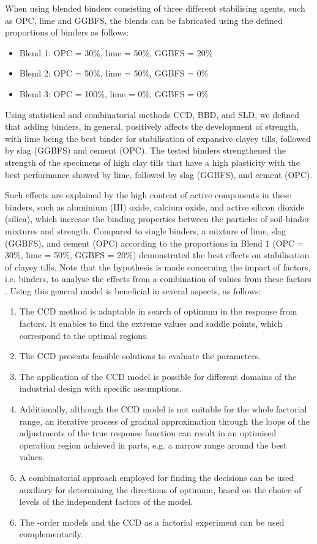 \documentclass[eprint,
]{actapoly}
\begin{document}
When using blended binders consisting of three different stabilising agents, such as OPC, lime and GGBFS, the blends can be fabricated using the defined proportions of binders as follows:

\begin{itemize}
	\item [--] Blend 1: OPC = 30\%, lime = 50\%, GGBFS = 20\%
	\item [--] Blend 2: OPC = 50\%, lime = 50\%, GGBFS = 0\%
	\item [--] Blend 3: OPC = 100\%, lime = 0\%, GGBFS = 0\%
\end{itemize}

Using statistical and combinatorial methods CCD, BBD, and SLD, we defined that adding binders, in general, positively affects the development of strength, with lime being the best binder for stabilisation of expansive clayey tills, followed by slag (GGBFS) and cement (OPC). The tested binders strengthened the strength of the specimens of high clay tills that have a high plasticity with the best performance showed by lime, followed by slag (GGBFS), and cement (OPC). 

Such effects are explained by the high content of active components in these binders, such as aluminium (III) oxide, calcium oxide, and active silicon dioxide (silica), which increase the binding properties between the particles of soil-binder mixtures and strength. Compared to single binders, a mixture of lime, slag (GGBFS), and cement (OPC) according to the proportions in Blend 1 (OPC = 30\%, lime = 50\%, GGBFS = 20\%) demonstrated the best effects on stabilisation of clayey tills. Note that the hypothesis is made concerning the impact of factors, i.e. binders, to analyse the effects from a combination of values from these factors \cite{StatSoft}. Using this general model is beneficial in several aspects, as follows:

\begin{enumerate}
	\item The CCD method is adaptable in search of optimum in the response from factors. It enables to find the extreme values and saddle points, which correspond to the optimal regions.
	\item The CCD presents feasible solutions to evaluate the parameters.
	\item The application of the CCD model is possible for different domains of the industrial design with specific assumptions.
	\item Additionally, although the CCD model is not suitable for the whole factorial range, an iterative process of gradual approximation through the loops of the adjustments of the true response function can result in an optimised operation region achieved in parts, e.g. a narrow range around the best values.
	\item A combinatorial approach employed for finding the decisions can be used auxiliary for determining the directions of optimum, based on the choice of levels of the independent factors of the model.
	\item The -order models and the CCD as a factorial experiment can be used complementarily. 
\end{enumerate}
\end{document}
